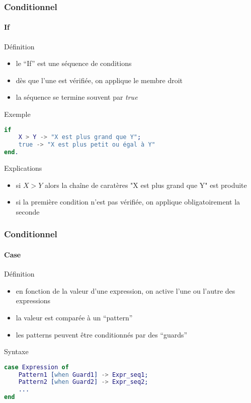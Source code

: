 \begin{frame}[fragile]
  \frametitle{Conditionnel}
  \framesubtitle{If}

  \begin{block}{Définition}
    \begin{itemize}
    \item le ``If'' est une séquence de conditions
    \item dès que l'une est vérifiée, on applique le membre droit
    \item la séquence se termine souvent par \textit{true}
    \end{itemize}
  \end{block}

  \begin{exampleblock}{Exemple}
    \begin{lstlisting}[language=erlang]
if
    X > Y -> "X est plus grand que Y";
    true -> "X est plus petit ou égal à Y"
end.
    \end{lstlisting}
  \end{exampleblock}

  \begin{alertblock}{Explications}
    \begin{itemize}
    \item si $X > Y$ alors la chaîne de caratères "X est plus grand que Y"
      est produite
    \item si la première condition n'est pas vérifiée, on applique
      obligatoirement la seconde
    \end{itemize}
  \end{alertblock}

\end{frame}

\begin{frame}[fragile]
  \frametitle{Conditionnel}
  \framesubtitle{Case}

  \begin{block}{Définition}
    \begin{itemize}
    \item en fonction de la valeur d'une expression, on active l'une ou l'autre
      des expressions
    \item la valeur est comparée à un ``pattern''
    \item les patterns peuvent être conditionnés par des ``guards''
    \end{itemize}
  \end{block}

  \begin{exampleblock}{Syntaxe}
    \begin{lstlisting}[language=erlang]
case Expression of
    Pattern1 [when Guard1] -> Expr_seq1;
    Pattern2 [when Guard2] -> Expr_seq2;
    ...
end
    \end{lstlisting}
  \end{exampleblock}

\end{frame}

